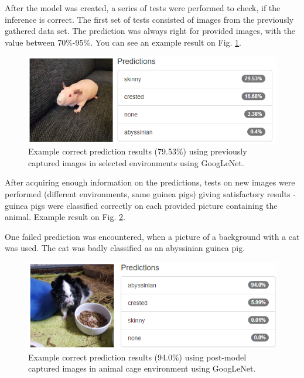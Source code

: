 \documentclass[10pt,journal,compsoc]{IEEEtran}
\begin{document}
    After the model was created, a series of tests were performed to check, if the inference is correct. The first set of tests consisted of images from the previously gathered data set. The prediction was always right for provided images, with the value between 70\%-95\%. You can see an example result on Fig. \ref{fig:result_01}.
    
    \begin{figure}[h]
        \includegraphics[width=\linewidth]{result_01.png}
        \caption{Example correct prediction results (79.53\%) using previously captured images in selected environments using GoogLeNet.}
        \label{fig:result_01}
        \centering
    \end{figure}

    After acquiring enough information on the predictions, tests on new images were performed (different environments, same guinea pigs) giving satisfactory results - guinea pigs were classified correctly on each provided picture containing the animal. Example result on Fig. \ref{fig:result_02}.

    One failed prediction was encountered, when a picture of a background with a cat was used. The cat was badly classified as an abyssinian guinea pig.

    \begin{figure}[h]
        \includegraphics[width=\linewidth]{result_02.png}
        \caption{Example correct prediction results (94.0\%) using post-model captured images in animal cage environment using GoogLeNet.}
        \label{fig:result_02}
        \centering
    \end{figure}
    
\end{document}

